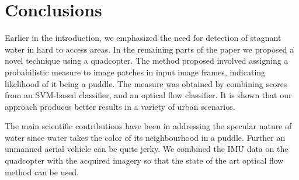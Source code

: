 \section{Conclusions}

Earlier in the introduction, we emphasized the need for detection of
stagnant water in hard to access areas. In the remaining parts of the
paper we proposed a novel technique using a quadcopter.
The method proposed involved assigning a probabilistic measure to
image patches in input image frames, indicating likelihood of it being
a puddle. The measure was obtained by combining scores from an
SVM-based classifier, and an optical flow classifier. It is shown that
our approach produces better results in a variety of urban scenarios.

The main scientific contributions have been in addressing the specular
nature of water since water takes the color of its neighbourhood in a
puddle. Further an unmanned aerial vehicle can be quite jerky.  We
combined the IMU data on the quadcopter with the acquired imagery so
that the state of the art optical flow method can be used. 